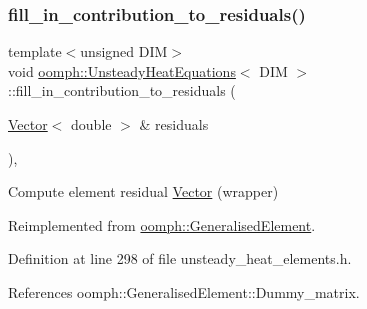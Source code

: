 \subsubsection{\texorpdfstring{fill\+\_\+in\+\_\+contribution\+\_\+to\+\_\+residuals()}{fill\_in\_contribution\_to\_residuals()}}
{\footnotesize\ttfamily template$<$unsigned D\+IM$>$ \\
void \hyperlink{classoomph_1_1UnsteadyHeatEquations}{oomph\+::\+Unsteady\+Heat\+Equations}$<$ D\+IM $>$\+::fill\+\_\+in\+\_\+contribution\+\_\+to\+\_\+residuals (\begin{DoxyParamCaption}\item[{\hyperlink{classoomph_1_1Vector}{Vector}$<$ double $>$ \&}]{residuals }\end{DoxyParamCaption})\hspace{0.3cm}{\ttfamily [inline]}, {\ttfamily [virtual]}}



Compute element residual \hyperlink{classoomph_1_1Vector}{Vector} (wrapper) 



Reimplemented from \hyperlink{classoomph_1_1GeneralisedElement_a310c97f515e8504a48179c0e72c550d7}{oomph\+::\+Generalised\+Element}.



Definition at line 298 of file unsteady\+\_\+heat\+\_\+elements.\+h.



References oomph\+::\+Generalised\+Element\+::\+Dummy\+\_\+matrix.

\mbox{\label{classoomph_1_1UnsteadyHeatEquations_acde24104d5adcabe8a76a3a52c17ab5f}} 

